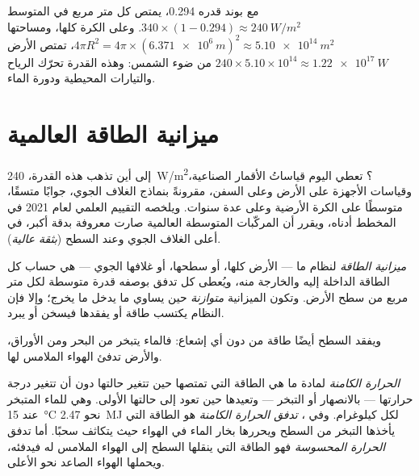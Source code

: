 \begin{example}\label{ex:g10:earth-energy-budget:absorbed}
مع  بوند قدره 0.294، يمتص كل متر مربع في المتوسط $340
\times (1 - 0.294) \approx \qty{240}{W/m^2}$. وعلى الكرة كلها، ومساحتها
$4\pi R^2 = 4\pi \times (\qty{6.371e6}{m})^2 \approx \qty{5.10e14}{m^2}$، تمتص
الأرض $240 \times 5.10\times10^{14} \approx \qty{1.22e17}{W}$ من
ضوء الشمس: وهذه القدرة تحرّك الرياح والتيارات المحيطية ودورة
الماء.
\end{example}

\section{ميزانية الطاقة العالمية}

إلى أين تذهب هذه القدرة، \qty{240}{W/m^2}؟ تعطي اليوم قياساتُ الأقمار الصناعية، وقياسات
الأجهزة على الأرض وعلى السفن، مقرونةً بنماذج الغلاف الجوي، جوابًا متسقًا، متوسطًا
على الكرة الأرضية وعلى عدة سنوات. ويلخصه التقييم العلمي لعام 2021 في المخطط أدناه،
ويقرر أن المركّبات المتوسطة العالمية صارت معروفة بدقة أكبر، في أعلى الغلاف الجوي
وعند السطح (\emph{بثقة
عالية}).

\begin{definition}\label{def:g10:earth-energy-budget:energy-budget}
\emph{ميزانية الطاقة} لنظام ما --- الأرض كلها، أو سطحها،
أو غلافها الجوي --- هي حساب كل الطاقة الداخلة إليه والخارجة منه، ويُعطى كل تدفق
بوصفه قدرة متوسطة لكل متر مربع من سطح الأرض. وتكون الميزانية \emph{متوازنة} حين
يساوي ما يدخل ما يخرج؛ وإلا فإن النظام يكتسب طاقة أو يفقدها فيسخن أو
يبرد.
\end{definition}

ويفقد السطح أيضًا طاقة من دون أي إشعاع: فالماء يتبخر من البحر ومن الأوراق،
والأرض تدفئ الهواء الملامس لها.

\begin{definition}\label{def:g10:earth-energy-budget:latent-heat}
\emph{الحرارة الكامنة} لمادة ما هي الطاقة التي تمتصها حين
تتغير حالتها دون أن تتغير درجة حرارتها --- بالانصهار أو التبخر --- وتعيدها حين
تعود إلى حالتها الأولى. وهي للماء المتبخر عند \qty{15}{\degreeCelsius} نحو
\qty{2.47}{MJ} لكل كيلوغرام. وفي ، \emph{تدفق الحرارة الكامنة}
هو الطاقة التي يأخذها التبخر من السطح ويحررها بخار الماء في الهواء حيث يتكاثف
سحبًا. أما تدفق \emph{الحرارة المحسوسة}
فهو الطاقة التي ينقلها السطح إلى الهواء الملامس له فيدفئه، ويحملها الهواء الصاعد
نحو الأعلى.
\end{definition}

